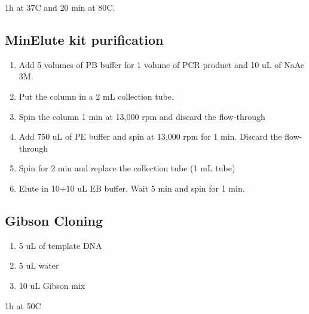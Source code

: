 \documentclass[11pt]{article}
\begin{document}
1h at 37C and 20 min at 80C.\\

\subsection{MinElute kit purification}
\label{sec:orgc9ff965}
\begin{enumerate}
\item Add 5 volumes of PB buffer for 1 volume of PCR product and 10 uL of NaAc 3M.\\
\item Put the column in a 2 mL collection tube.\\
\item Spin the column 1 min at 13,000 rpm and discard the flow-through\\
\item Add 750 uL of PE buffer and spin at 13,000 rpm for 1 min. Discard the flow-through\\
\item Spin for 2 min and replace the collection tube (1 mL tube)\\
\item Elute in 10+10 uL EB buffer. Wait 5 min and spin for 1 min.\\
\end{enumerate}

\subsection{Gibson Cloning}
\label{sec:orgac24f5c}
\begin{enumerate}
\item 5 uL of template DNA\\
\item 5 uL water\\
\item 10 uL Gibson mix\\
\end{enumerate}

1h at 50C\\
\end{document}
